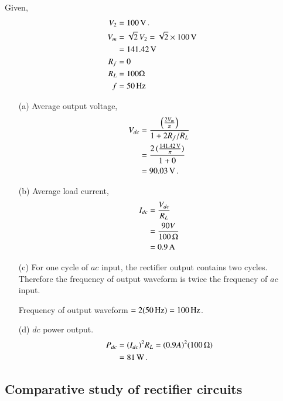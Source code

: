 \begin{solution}
Given,
\begin{align*}
V_2 & = 100 \operatorname{\mathrm{V}}.\\
V_m & = \sqrt{2}\, V_2=\sqrt{2}\times 100\text{\,V}\\
& = 141.42 \operatorname{\mathrm{V}}\\
R_f & = 0\\
R_L & = 100 \Omega\\
f & = 50 \operatorname{Hz}
\end{align*}

\begin{itemize}
\item[(a)] Average output voltage, 
\begin{align*}
V_{dc} & = \frac{\left(\frac{2 V_m}{\pi} \right)}{1 +2 R_f / R_L}
\\
& = \frac{2\,(\frac{141.42 \operatorname{\mathrm{V}}}{\pi})}{1+0}\\
& = 90.03 \operatorname{\mathrm{V}}.
\end{align*}

\item[(b)] Average load current,
\begin{align*}
I_{dc} & = \frac{V_{dc}}{R_L}\\
& = \frac{90 V}{100\, \Omega} \\
& = 0.9\text{\,A}
\end{align*}

\item[(c)] For one cycle of $ac$ input, the rectifier output contains
  two cycles. Therefore the frequency of output waveform is twice the
  frequency of $ac$ input.

Frequency of output waveform $=2(50\operatorname{Hz}) = 100 \operatorname{Hz}$.

\item[(d)] $dc$ power output.
\begin{align*}
P_{dc} & = (I_{dc})^2 R_L = (0.9 A)^2 (100\, \Omega)\\
& = 81 \operatorname{W}.
\end{align*}
\end{itemize}

\subsection{Comparative study of rectifier circuits}\label{sec2.17.1}


\end{solution}
